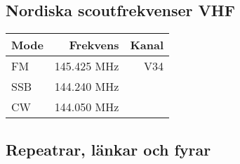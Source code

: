 \subsection{Nordiska scoutfrekvenser VHF}

\begin{center}
\begin{tabular}{lrr}
	\textbf{Mode} & \textbf{Frekvens} & \textbf{Kanal} \\ \hline
	FM            &      145.425  MHz &   V34 \\
	SSB           &      144.240  MHz &  \\
	CW            &      144.050  MHz &
\end{tabular}
\end{center}


\begin{landscape}
\section{Repeatrar, länkar och fyrar}

\end{landscape}
